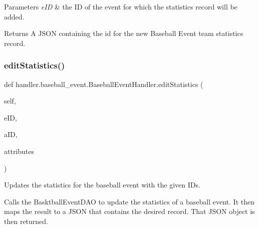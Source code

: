 \begin{DoxyParams}{Parameters}
{\em e\+ID} & the ID of the event for which the statistics record will be added.\\
\hline
\end{DoxyParams}
\begin{DoxyReturn}{Returns}
A J\+S\+ON containing the id for the new Baseball Event team statistics record. 
\end{DoxyReturn}
\mbox{\label{classhandler_1_1baseball__event_1_1_baseball_event_handler_a9fd84dd8bbbab63b021d9c00e3d89eb2}} 
\subsubsection{\texorpdfstring{edit\+Statistics()}{editStatistics()}}
{\footnotesize\ttfamily def handler.\+baseball\+\_\+event.\+Baseball\+Event\+Handler.\+edit\+Statistics (\begin{DoxyParamCaption}\item[{}]{self,  }\item[{}]{e\+ID,  }\item[{}]{a\+ID,  }\item[{}]{attributes }\end{DoxyParamCaption})}



Updates the statistics for the baseball event with the given I\+Ds. 

Calls the Basktball\+Event\+D\+AO to update the statistics of a baseball event. It then maps the result to a J\+S\+ON that contains the desired record. That J\+S\+ON object is then returned.


